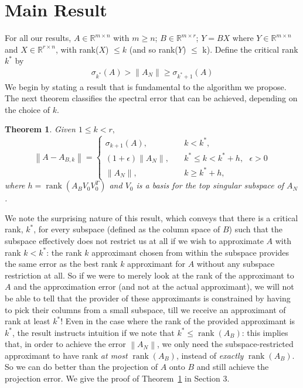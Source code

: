 \documentclass[11pt]{article}
\newcommand{\rank}{\operatorname{rank}}
\newtheorem{theorem}{Theorem}
\renewcommand{\math}[1]{$#1$}
\def\reals{\mathbb{R}}
\newcommand{\norm}[1]{\left\|#1\right\|}
\begin{document}
\section{Main Result}
For all our results, $A \in \reals^{m \times n}$ with $m \geq n$; $B \in \reals^{m \times r}$; $Y = BX$ where $Y \in \reals^{m \times n}$ and $X \in \reals^{r \times n}$, with rank($X$) $\leq k$ (and so rank($Y$) $\leq$ k). Define the critical rank $k^*$ by
\begin{eqnarray}\label{critical rank inequality}
\sigma_{k^*}(A) > \norm{A_N} \geq \sigma_{k^*+1}(A)
\end{eqnarray}
We begin by stating a result that is fundamental to the algorithm we propose. 
The next theorem classifies the spectral error that can be achieved, depending on the choice of \math{k}.
\begin{theorem}\label{main theorem}
Given $1 \leq k < r,$
\[ \norm{A - A_{B,k}} = \left\{ \begin{array}{ll} \sigma_{k+1}(A), & \quad k < k^*,\\[5 pt] (1+\epsilon)\norm{A_N}, & \quad k^* \leq k < k^*+h, \text{ }\epsilon > 0 \\[5 pt] \norm{A_N}, & \quad k \geq k^*+h,  \end{array} \right. \]
where $h=\rank(A_BV_0V_0^T)$ 
and \math{V_0} is a basis for the top singular subspace of $A_N$.
\end{theorem}
\noindent We note the surprising nature of this result, which conveys that there is a critical rank, $k^*$, for every subspace (defined as the column space of $B$) such that the subspace effectively does not restrict us at all if we wish to approximate $A$ with rank $k < k^*$: the rank $k$ approximant chosen from within the subspace provides the same error as the best rank $k$ approximant for $A$ without any subspace restriction at all. So if we were to merely look at the rank of the approximant to $A$ and the approximation error (and not at the actual approximant), we will not be able to tell that the provider of these approximants is constrained by having to pick their columns from a small subspace, till we receive an approximant of rank at least $k^*$! Even in the case where the rank of the provided approximant is $k^*$, the result instructs intuition if we note that $k^* \leq \rank(A_B)$: this implies that, in order to achieve the error $\norm{A_N}$, we only need the subspace-restricted approximant to have rank \emph{at most} $\rank(A_B)$, instead of \emph{exactly} $\rank(A_B)$. So we can do better than the projection of $A$ onto $B$ and still achieve the projection error. 
We give the proof of Theorem~\ref{main theorem} in Section 3. 
\end{document}
